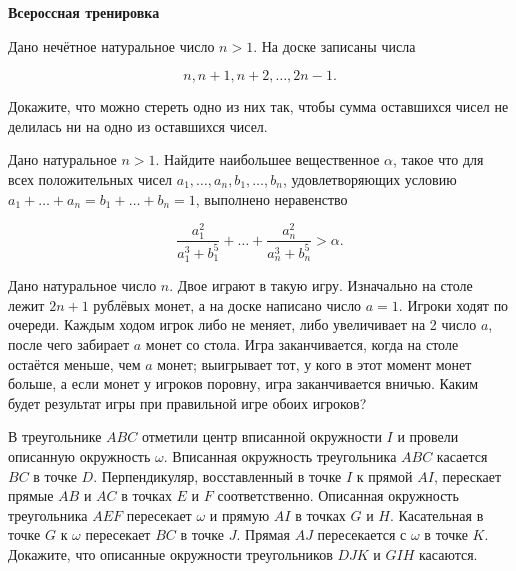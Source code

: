 \centerline{\bf \Huge Всероссная тренировка}

Дано нечётное натуральное число $n>1$. На доске записаны числа

$$
n, n+1, n+2, \ldots, 2 n-1 .
$$


Докажите, что можно стереть одно из них так, чтобы сумма оставшихся чисел не делилась ни на одно из оставшихся чисел.

Дано натуральное $n>1$. Найдите наибольшее вещественное $\alpha$, такое что для всех положительных чисел $a_1, \ldots, a_n, b_1, \ldots, b_n$, удовлетворяющих условию $a_1+\ldots+a_n=b_1+\ldots+b_n=1$, выполнено неравенство

$$
\frac{a_1^2}{a_1^3+b_1^5}+\ldots+\frac{a_n^2}{a_n^3+b_n^5}>\alpha .
$$


Дано натуральное число $n$. Двое играют в такую игру. Изначально на столе лежит $2 n+1$ рублёвых монет, а на доске написано число $a=1$. Игроки ходят по очереди. Каждым ходом игрок либо не меняет, либо увеличивает на 2 число $a$, после чего забирает $a$ монет со стола. Игра заканчивается, когда на столе остаётся меньше, чем $a$ монет; выигрывает тот, у кого в этот момент монет больше, а если монет у игроков поровну, игра заканчивается вничью. Каким будет результат игры при правильной игре обоих игроков?

В треугольнике $A B C$ отметили центр вписанной окружности $I$ и провели описанную окружность $\omega$. Вписанная окружность треугольника $A B C$ касается $B C$ в точке $D$. Перпендикуляр, восставленный в точке $I$ к прямой $A I$, перескает прямые $A B$ и $A C$ в точках $E$ и $F$ соответственно. Описанная окружность треугольника $A E F$ пересекает $\omega$ и прямую $A I$ в точках $G$ и $H$. Касательная в точке $G$ к $\omega$ пересекает $B C$ в точке $J$. Прямая $A J$ пересекается с $\omega$ в точке $K$. Докажите, что описанные окружности треугольников $D J K$ и $G I H$ касаются.
